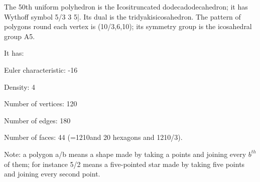 The 50th uniform polyhedron is the Icositruncated dodecadodecahedron; it has Wythoff symbol 5/3 3 5|. Its dual is the tridyakisicosahedron. The pattern of polygons round each vertex is (10/3,6,10); its symmetry group is the icosahedral group A5.\par
It has:\par
Euler characteristic: -16\par
Density: 4\par
Number of vertices: 120\par
Number of edges:  180\par
Number of faces: 44 (=12{10}and 20 hexagons and 12{10/3}).\par
Note: a polygon a/b means a shape made by taking a points and joining every $b^{th}$  of them; for instance 5/2 means a five-pointed star made by taking five points and joining every second point.